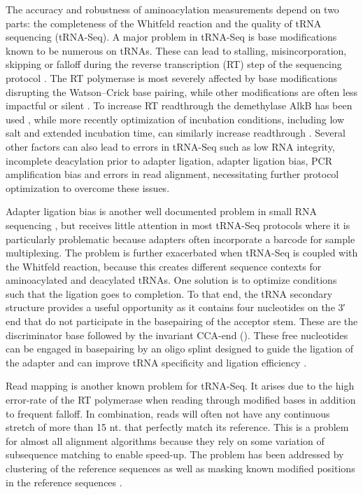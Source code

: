 \documentclass[9pt,lineno]{elife}
\begin{document}
The accuracy and robustness of aminoacylation measurements depend on two parts: the completeness of the Whitfeld reaction and the quality of tRNA sequencing (tRNA-Seq).
A major problem in tRNA-Seq is base modifications known to be numerous on tRNAs.
These can lead to stalling, misincorporation, skipping or falloff during the reverse transcription (RT) step of the sequencing protocol \citep{Motorin2007-nb}.
The RT polymerase is most severely affected by base modifications disrupting the Watson–Crick base pairing, while other modifications are often less impactful or silent \citep{Wang2021-fc, Sas-Chen2019-um}.
To increase RT readthrough the demethylase AlkB has been used \citep{Zheng2015-kj, Cozen2015-cx}, while more recently optimization of incubation conditions, including low salt and extended incubation time, can similarly increase readthrough \citep{Behrens2021-gb}.
Several other factors can also lead to errors in tRNA-Seq such as low RNA integrity, incomplete deacylation prior to adapter ligation, adapter ligation bias, PCR amplification bias and errors in read alignment, necessitating further protocol optimization to overcome these issues. 

Adapter ligation bias is another well documented problem in small RNA sequencing \citep{Fuchs2015-nb, Zhuang2012-nu}, but receives little attention in most tRNA-Seq protocols where it is particularly problematic because adapters often incorporate a barcode for sample multiplexing.
The problem is further exacerbated when tRNA-Seq is coupled with the Whitfeld reaction, because this creates different sequence contexts for aminoacylated and deacylated tRNAs.
One solution is to optimize conditions such that the ligation goes to completion.
To that end, the tRNA secondary structure provides a useful opportunity as it contains four nucleotides on the 3′ end that do not participate in the basepairing of the acceptor stem.
These are the discriminator base followed by the invariant CCA-end ().
These free nucleotides can be engaged in basepairing by an oligo splint designed to guide the ligation of the adapter and can improve tRNA specificity and ligation efficiency \citep{Shigematsu2017-tv, Smith2015-ht}.

Read mapping is another known problem for tRNA-Seq.
It arises due to the high error-rate of the RT polymerase when reading through modified bases in addition to frequent falloff.
In combination, reads will often not have any continuous stretch of more than 15 nt. that perfectly match its reference.
This is a problem for almost all alignment algorithms because they rely on some variation of subsequence matching to enable speed-up.
The problem has been addressed by clustering of the reference sequences \citep{Hoffmann2018-uz} as well as masking known modified positions in the reference sequences \citep{Behrens2021-gb}.
\end{document}
